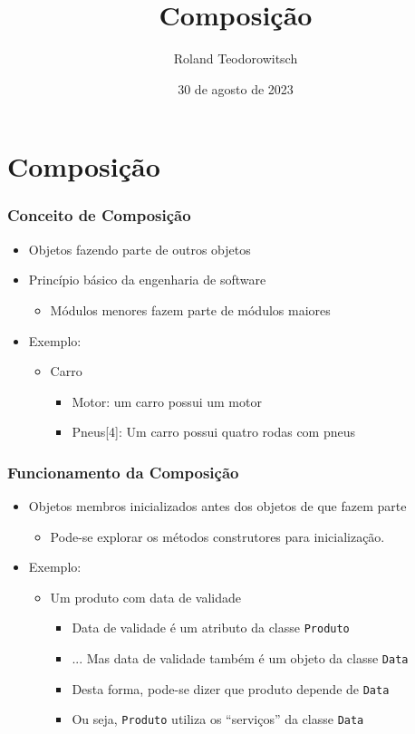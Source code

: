 \documentclass[aspectratio=169]{beamer}
\title[\sc{Composição}]{Composição}
\author[Roland Teodorowitsch]{Roland Teodorowitsch}
\institute[POO - EC - PUCRS]{Programação Orientada a Objetos - ECo - Curso de Engenharia de Computação - PUCRS}
\date{30 de agosto de 2023}
\begin{document}
\justifying

\begin{frame}
	\titlepage
\end{frame}

\section{Composição}

\begin{frame}\frametitle{Conceito de Composição}
\begin{itemize}
	\item Objetos fazendo parte de outros objetos
	\item Princípio básico da engenharia de software
	\begin{itemize}
		\item Módulos menores fazem parte de módulos maiores
	\end{itemize}
	\item Exemplo:
	\begin{itemize}
		\item Carro
		\begin{itemize}
			\item Motor: um carro possui um motor
			\item Pneus[4]: Um carro possui quatro rodas com pneus
		\end{itemize}
	\end{itemize}
\end{itemize}
\end{frame}

\begin{frame}\frametitle{Funcionamento da Composição}
\begin{itemize}
	\item Objetos membros inicializados antes dos objetos de que fazem parte
	\begin{itemize}
		\item Pode-se explorar os métodos construtores para inicialização.
	\end{itemize}
	\item Exemplo:
	\begin{itemize}
		\item Um produto com data de validade
		\begin{itemize}
			\item Data de validade é um atributo da classe \texttt{Produto}
			\item ... Mas data de validade também é um objeto da classe \texttt{Data}
			\item Desta forma, pode-se dizer que produto depende de \texttt{Data}
			\item Ou seja, \texttt{Produto} utiliza os ``serviços'' da classe \texttt{Data}
		\end{itemize}
	\end{itemize}
\end{itemize}
\end{frame}
\end{document}
